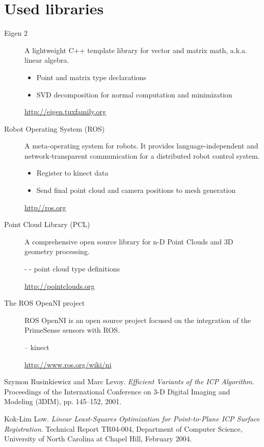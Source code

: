 \documentclass[10pt,twocolumn,letterpaper]{article}
\begin{document}
\section{Used libraries}
\label{libraries}
\begin{description}
\item[Eigen 2]
A lightweight C++ template library for vector and matrix math,
a.k.a. linear algebra.

\begin{itemize}
\item Point and matrix type declarations
\item SVD decomposition for normal computation and minimization
\end{itemize}

\href{http://eigen.tuxfamily.org}{http://eigen.tuxfamily.org}

\item[Robot Operating System (ROS)]
A meta-operating system for robots. It provides
language-independent and network-transparent communication for a
distributed robot control system.

\begin{itemize}
\item Register to kinect data
\item Send final point cloud and camera positions to mesh generation
\end{itemize}

\href{http://ros.org}{http//ros.org}

\item[Point Cloud Library (PCL)]
A comprehensive open source library for n-D Point Clouds and 3D geometry processing.

- - point cloud type definitions

\href{http://pointclouds.org}{http://pointclouds.org}

\item[The ROS OpenNI project]
ROS OpenNI is an open source project focused on the integration of the PrimeSense sensors with ROS.

-- kinect

\href{http://www.ros.org/wiki/ni}{http://www.ros.org/wiki/ni}

\end{description}

\begin{thebibliography}{99}
Szymon Rusinkiewicz and Marc Levoy.
\emph{Efficient Variants of the ICP Algorithm}.
Proceedings of the International Conference on 3-D Digital Imaging and
Modeling (3DIM), pp. 145–152, 2001.

Kok-Lim Low.
\emph{Linear Least-Squares Optimization for
Point-to-Plane ICP Surface Registration}.
Technical Report TR04-004, Department of Computer Science, University of North Carolina at Chapel Hill, February 2004.

\end{thebibliography}
\end{document}

